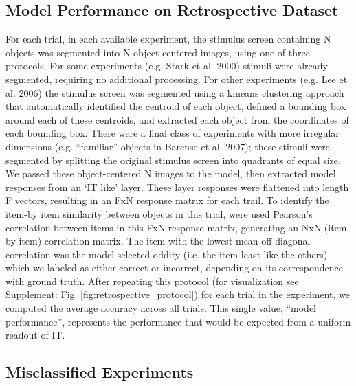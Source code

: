 \documentclass[11pt]{article}
\begin{document}
\subsection{Model Performance on Retrospective Dataset}

For each trial, in each available experiment, the stimulus screen containing N objects was segmented into N object-centered images, using one of three protocols. For some experiments (e.g. Stark et al. 2000) stimuli were already segmented, requiring no additional processing. For other experiments (e.g. Lee et al. 2006) the stimulus screen was segmented using a kmeans clustering approach that automatically identified the centroid of each object, defined a bounding box around each of these centroids, and extracted each object from the coordinates of each bounding box. There were a final class of experiments with more irregular dimensions (e.g. “familiar” objects in Barense et al. 2007); these stimuli were segmented by splitting the original stimulus screen into quadrants of equal size. We passed these object-centered N images to the model, then extracted model responses from an `IT like' layer. These layer responses were flattened into length F vectors, resulting in an FxN response matrix for each trail. To identify the item-by item similarity between objects in this trial, were used Pearson’s correlation between items in this FxN response matrix, generating an NxN (item-by-item) correlation matrix. The item with the lowest mean off-diagonal correlation was the model-selected oddity (i.e. the item least like the others) which we labeled as either correct or incorrect, depending on its correspondence with ground truth. After repeating this protocol (for visualization see Supplement: Fig. \ref{fig:retrospective_protocol}) for each trial in the experiment, we computed the average accuracy across all trials. This single value, “model performance”, represents the performance that would be expected from a uniform readout of IT.

\subsection{Misclassified Experiments}
\end{document}
